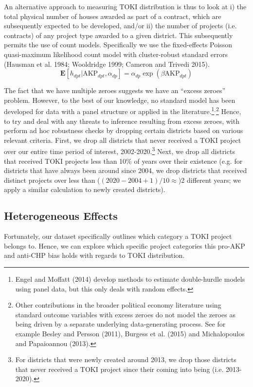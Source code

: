 \documentclass[10pt, oneside]{article}   	%
\numberwithin{equation}{section}
\begin{document}
An alternative approach to measuring TOKI distribution is thus to look at i) the total physical number of houses awarded as part of a contract, which are subsequently expected to be developed, and/or ii) the number of projects (i.e. contracts) of any project type awarded to a given district. This subsequently permits the use of count models. Specifically we use the fixed-effects Poisson quasi-maximum likelihood count model with cluster-robust standard errors (Hausman et al. 1984; Wooldridge 1999; Cameron and Trivedi 2015). 
\begin{equation}
    \mathbf{E}[h_{dpt}|\text{AKP}_{dpt},\alpha_{dp}] = \alpha_{dp}\exp (\beta \text{AKP}_{dpt})
\end{equation}

The fact that we have multiple zeroes suggests we have an ``excess zeroes'' problem. However, to the best of our knowledge, no standard model has been developed for data with a panel structure or applied in the literature.\footnote{Engel and Moffatt (2014) develop methods to estimate double-hurdle models using panel data, but this only deals with random effects.}$^,$\footnote{Other contributions in the broader political economy literature using standard outcome variables with excess zeroes do not model the zeroes as being driven by a separate underlying data-generating process. See for example Besley and Persson (2011), Burgess et al. (2015) and Michalopoulos and Papaioannou (2013).} Hence, to try and deal with any threats to inference resulting from excess zeroes, with perform ad hoc robustness checks by dropping certain districts based on various relevant criteria. First, we drop all districts that never received a TOKI project over our entire time period of interest, 2002-2020.\footnote{For districts that were newly created around 2013, we drop those districts that never received a TOKI project since their coming into being (i.e. 2013-2020).} Next, we drop all districts that received TOKI projects less than 10\% of years over their existence (e.g. for districts that have always been around since 2004, we drop districts that received distinct projects over less than ($(2020-2004+1)/10\approx$)2 different years; we apply a similar calculation to newly created districts). 

\subsection{Heterogeneous Effects}

Fortunately, our dataset specifically outlines which category a TOKI project belongs to. Hence, we can explore which specific project categories this pro-AKP and anti-CHP bias holds with regards to TOKI distribution. 
\end{document}

